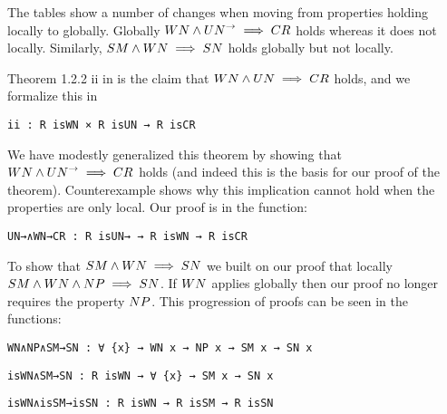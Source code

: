
The tables show a number of changes when moving from properties holding locally to globally. 
Globally $\WN \land \UNto \implies \CR$ holds whereas it does not locally. Similarly, $\SM \land \WN \implies \SN$ holds 
globally but not locally. 

Theorem 1.2.2 ii in \terese is the claim that $\WN \land \UN \implies \CR$ holds, and we formalize this in


\verb|ii : R isWN × R isUN → R isCR| \footnotemark[3]

We have modestly generalized this theorem by showing that $\WN \land \UNto \implies \CR$ holds (and indeed this is the basis for our proof of the theorem). 
Counterexample  shows why this implication cannot hold when the properties are only local. Our proof is in the function:

\verb|UN→∧WN→CR : R isUN→ → R isWN → R isCR| \footnotemark[1]

To show that $\SM \land \WN \implies \SN$ we built on our proof that locally $\SM \land \WN \land \NP \implies \SN$. If $\WN$ applies 
globally then our proof no longer requires the property $\NP$. This progression of proofs can be seen in the functions:

\verb|WN∧NP∧SM→SN : ∀ {x} → WN x → NP x → SM x → SN x| 

\verb|isWN∧SM→SN : R isWN → ∀ {x} → SM x → SN x|

\verb|isWN∧isSM→isSN : R isWN → R isSM → R isSN| \footnotemark[1]